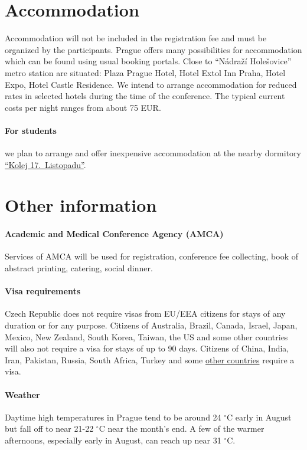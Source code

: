 \documentclass[12pt]{extarticle}
\begin{document}
\section*{Accommodation}
\noindent
Accommodation will not be included in the registration fee and must be organized by the participants.
Prague offers many possibilities for accommodation which can be found using usual booking portals. Close
to “Nádraží Holešovice” metro station are situated: Plaza Prague Hotel, Hotel Extol Inn Praha, Hotel Expo, Hotel
Castle Residence. We intend to arrange accommodation for reduced rates in selected hotels during the time of
the conference. The typical current costs per night ranges from about 75 EUR.

\paragraph{For students} we plan to arrange and offer inexpensive accommodation at the nearby dormitory \href{https://kam.cuni.cz/KAMEN-54.html}{``Kolej 17.\ Listopadu''}.

\section*{Other information}

\paragraph{Academic and Medical Conference Agency (AMCA)}
Services of AMCA will be used for registration, conference fee
collecting, book of abstract printing, catering, social dinner.

\paragraph{Visa requirements}
Czech Republic does not require visas from EU/EEA citizens for stays
of any duration or for any purpose. Citizens of Australia, Brazil,
Canada, Israel, Japan, Mexico, New Zealand, South Korea, Taiwan, the
US and some other countries will also not require a visa for stays of
up to 90 days. Citizens of China, India, Iran, Pakistan, Russia, South
Africa, Turkey and some
\href{https://www.mzv.cz/jnp/en/information_for_aliens/short_stay_visa/list_of_states_whose_citizens_are/index.html}{other countries} require a visa.

\paragraph{Weather}
Daytime high temperatures in Prague tend to be around 24 ${}^\circ$C early in August but fall off to near
21-22 ${}^\circ$C near the month's end. A few of the warmer afternoons, especially early in August, can reach
up near 31 ${}^\circ$C.
\end{document}
